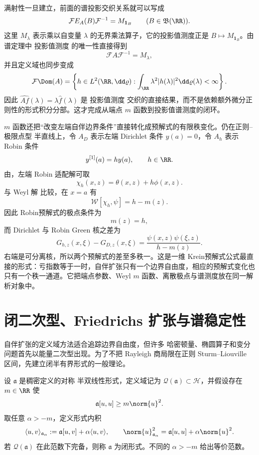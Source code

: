 满射性一旦建立，前面的谱投影交织关系就可以写成
\[
 \mathcal F E_A(B)\mathcal F^{-1}=M_{\mathbf1_B}
 \qquad(B\in\mathfrak B(\RR)).
\]
这里 $M_\lambda$ 表示乘以自变量 $\lambda$ 的无界乘法算子，它的投影值测度正是 $B\mapsto M_{\mathbf1_B}$。由谱定理中 投影值测度 的唯一性直接得到
\[
 \mathcal F A\mathcal F^{-1}=M_\lambda,
\]
并且定义域也同步变成
\[
 \mathcal F\Dom(A)
 =\left\{h\in L^2(\RR,\dd\varrho):
 \int_{\RR}\lambda^2|h(\lambda)|^2\dd\varrho(\lambda)<\infty\right\}.
\]
因此 $\widehat{Af}(\lambda)=\lambda\widehat f(\lambda)$ 是 投影值测度 交织的直接结果，而不是依赖额外微分正则性的形式积分分部。这才完成从端点 $m$ 函数到投影值谱测度的闭环。

$m$ 函数还把“改变左端自伴边界条件”直接转化成预解式的有限秩变化。仍在正则--极限点型 半直线上，令 $A_D$ 表示左端 Dirichlet 条件 $y(a)=0$，令 $A_h$ 表示 Robin 条件
\[
 y^{[1]}(a)=h y(a),
 \qquad h\in\RR.
\]
由，左端 Robin 适配解可取
\[
 \chi_h(x,z)=\theta(x,z)+h\phi(x,z).
\]
与 Weyl 解 比较，在 $x=a$ 有
\[
 \mathcal W[\chi_h,\psi]
 =h-m(z).
\]
因此 Robin预解式的极点条件为
\begin{equation*}m(z)=h,
\end{equation*}
而 Dirichlet 与 Robin Green 核之差为
\begin{equation*}G_{h,z}(x,\xi)-G_{D,z}(x,\xi)
 =\frac{\psi(x,z)\psi(\xi,z)}{h-m(z)}.
\end{equation*}
右端是可分离核，所以两个预解式的差至多秩一。这是一维 Krein预解式公式最直接的形式：亏指数等于一时，自伴扩张只有一个边界自由度，相应的预解式变化也只有一个秩一通道。它把端点参数、Weyl $m$ 函数、离散极点与谱测度放在同一解析对象中。



\section{闭二次型、Friedrichs 扩张与谱稳定性}

自伴扩张的定义域方法适合追踪边界自由度，但许多 哈密顿量、椭圆算子和变分问题首先以能量二次型出现。为了不把 Rayleigh 商局限在正则 Sturm--Liouville 区间，先建立闭半有界形式的一般理论。

\begin{definition}[下半有界闭形式]
设 $\mathfrak a$ 是稠密定义的对称 半双线性形式，定义域记为 $\mathcal Q(\mathfrak a)\subset\mathcal H$，并假设存在 $m\in\RR$ 使
\[
 \mathfrak a[u,u]\ge m\norm{u}^2.
\]
取任意 $\alpha>-m$，定义形式内积
\begin{equation}\label{eq:math-sl-form-norm}
 \langle u,v\rangle_{\mathfrak a_\alpha}
 :=\mathfrak a[u,v]+\alpha\langle u,v\rangle,
 \qquad
 \norm{u}_{\mathfrak a_\alpha}^2
 =\mathfrak a[u,u]+\alpha\norm{u}^2.
\end{equation}
若 $\mathcal Q(\mathfrak a)$ 在此范数下完备，则称 $\mathfrak a$ 为闭形式。不同的 $\alpha>-m$ 给出等价范数。
\end{definition}

